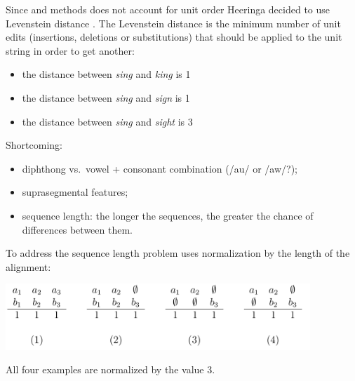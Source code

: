 \documentclass[
  ignorenonframetext,
]{beamer}
\providecommand{\tightlist}{%
  \setlength{\itemsep}{0pt}\setlength{\parskip}{0pt}}
\begin{document}
\begin{frame}{\citep{heeringa04}}
\protect\hypertarget{heeringa04}{}
Since \citep{hoppenbrouwers01} and \citep{nerbonne01} methods does not
account for unit order Heeringa decided to use Levenstein distance
\citep{levenstein65}. The Levenstein distance is the minimum number of
unit edits (insertions, deletions or substitutions) that should be
applied to the unit string in order to get another:

\begin{itemize}
\tightlist
\item
  the distance between \emph{sing} and \emph{king} is 1
\item
  the distance between \emph{sing} and \emph{sign} is 1
\item
  the distance between \emph{sing} and \emph{sight} is 3
\end{itemize}

Shortcoming:

\begin{itemize}
\tightlist
\item
  diphthong vs.~vowel + consonant combination (/au/ or /aw/?);
\item
  suprasegmental features;
\item
  sequence length: the longer the sequences, the greater the chance of
  differences between them.
\end{itemize}
\end{frame}

\begin{frame}{\citep{heeringa04}}
\protect\hypertarget{heeringa04-1}{}
To address the sequence length problem \citep{heeringa04} uses
normalization by the length of the alignment:

\begin{center}\includegraphics[width=4.52in]{images/heeringa04_norm} \end{center}

All four examples are normalized by the value 3.
\end{frame}
\end{document}
